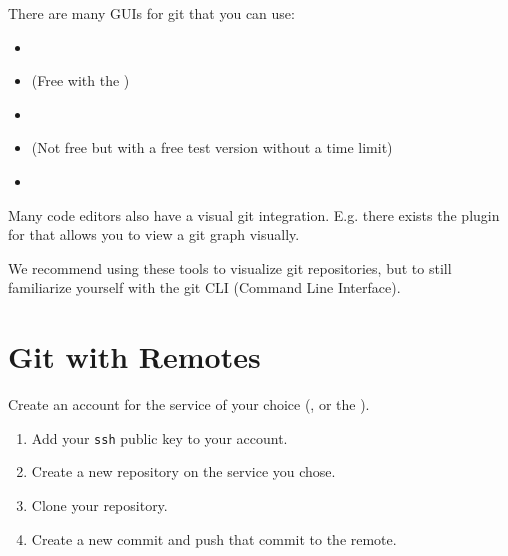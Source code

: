 \documentclass[english]{sheet}
\begin{document}
\begin{exercise}[subtitle={Git GUIs (optional)}]
    There are many GUIs for git that you can use:
    \begin{itemize}
        \item {}
        \item {} (Free with the )
        \item {}
        \item {} (Not free but with a free test version without a time limit)
        \item {}
    \end{itemize}

    Many code editors also have a visual git integration. E.g. there exists the  plugin for  that allows you to view a git graph visually.

    We recommend using these tools to visualize git repositories, but to still familiarize yourself with the git CLI (Command Line Interface).
\end{exercise}

\section{Git with Remotes}

\begin{exercise}
    Create an account for the service of your choice (,  or the ).
\end{exercise}

\begin{exercise}[subtitle={Creation of a Github/Gitlab repository}]
    \begin{enumerate}
        \item Add your \verb|ssh| public key to your account.
        \item Create a new repository on the service you chose.
        \item Clone your repository.
        \item Create a new commit and push that commit to the remote.
    \end{enumerate}
\end{exercise}
\end{document}
